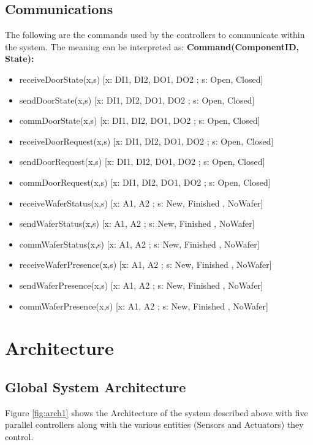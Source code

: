 \documentclass[a4paper,12pt]{article}
\begin{document}
\subsection {Communications}
The following are the commands used by the controllers to communicate within the system. The meaning can be interpreted as: 
\bigskip
\newline 
\textbf{Command(ComponentID, State):}
\begin{itemize}
\item receiveDoorState(x,s) [x: DI1, DI2, DO1, DO2 ; s: Open, Closed] 
\item sendDoorState(x,s) [x: DI1, DI2, DO1, DO2 ; s: Open, Closed]
\item commDoorState(x,s) [x: DI1, DI2, DO1, DO2 ; s: Open, Closed] 
\bigskip
\item receiveDoorRequest(x,s) [x: DI1, DI2, DO1, DO2 ; s: Open, Closed]
\item sendDoorRequest(x,s) [x: DI1, DI2, DO1, DO2 ; s: Open, Closed] 
\item commDoorRequest(x,s) [x: DI1, DI2, DO1, DO2 ; s: Open, Closed]
\bigskip
\item receiveWaferStatus(x,s) [x: A1, A2 ; s: New, Finished , NoWafer]
\item sendWaferStatus(x,s) [x: A1, A2 ; s: New, Finished , NoWafer]
\item commWaferStatus(x,s) [x: A1, A2 ; s: New, Finished , NoWafer]
\bigskip
\item receiveWaferPresence(x,s) [x: A1, A2 ; s: New, Finished , NoWafer]
\item sendWaferPresence(x,s) [x: A1, A2 ; s: New, Finished , NoWafer]
\item commWaferPresence(x,s) [x: A1, A2 ; s: New, Finished , NoWafer]
\end{itemize}
\newpage
\section{Architecture}
\subsection{Global System Architecture}
Figure \ref{fig:arch1} shows the Architecture of the system described above with five parallel controllers along with the various entities (Sensors and Actuators) they control.
\end{document}
